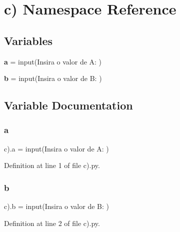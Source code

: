 \section{c) Namespace Reference}
\label{namespacec_08}
\subsection*{Variables}
\begin{DoxyCompactItemize}
\item 
\textbf{ a} = input(\textquotesingle{}Insira o valor de A\+: \textquotesingle{})
\item 
\textbf{ b} = input(\textquotesingle{}Insira o valor de B\+: \textquotesingle{})
\end{DoxyCompactItemize}


\subsection{Variable Documentation}
\mbox{\label{namespacec_08_a8be1c075b4149365ebed7668649fa6d1}} 
\subsubsection{a}
{\footnotesize\ttfamily c).a = input(\textquotesingle{}Insira o valor de A\+: \textquotesingle{})}



Definition at line 1 of file c).\+py.

\mbox{\label{namespacec_08_a29326d7c31f6c4ef217efa6c05412b49}} 
\subsubsection{b}
{\footnotesize\ttfamily c).b = input(\textquotesingle{}Insira o valor de B\+: \textquotesingle{})}



Definition at line 2 of file c).\+py.

